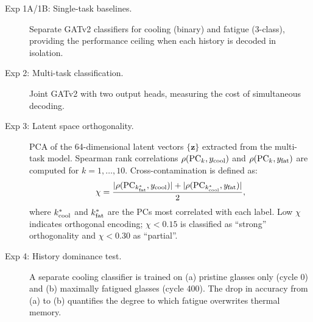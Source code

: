 \documentclass[12pt,a4paper]{article}
\newcommand{\xcontam}{\chi}
\begin{document}
\begin{description}
  \item[Exp 1A/1B: Single-task baselines.] Separate GATv2 classifiers for cooling (binary) and fatigue (3-class), providing the performance ceiling when each history is decoded in isolation.
  \item[Exp 2: Multi-task classification.] Joint GATv2 with two output heads, measuring the cost of simultaneous decoding.
  \item[Exp 3: Latent space orthogonality.] PCA of the 64-dimensional latent vectors $\{\mathbf{z}\}$ extracted from the multi-task model. Spearman rank correlations $\rho(\mathrm{PC}_k, y_{\rm cool})$ and $\rho(\mathrm{PC}_k, y_{\rm fat})$ are computed for $k = 1, \ldots, 10$. Cross-contamination is defined as:
  \begin{equation}
  \xcontam = \frac{|\rho(\mathrm{PC}_{k^*_{\rm fat}}, y_{\rm cool})| + |\rho(\mathrm{PC}_{k^*_{\rm cool}}, y_{\rm fat})|}{2},
  \label{eq:xcontam}
  \end{equation}
  where $k^*_{\rm cool}$ and $k^*_{\rm fat}$ are the PCs most correlated with each label. Low $\xcontam$ indicates orthogonal encoding; $\xcontam < 0.15$ is classified as ``strong'' orthogonality and $\xcontam < 0.30$ as ``partial''.
  \item[Exp 4: History dominance test.] A separate cooling classifier is trained on (a) pristine glasses only (cycle 0) and (b) maximally fatigued glasses (cycle 400). The drop in accuracy from (a) to (b) quantifies the degree to which fatigue overwrites thermal memory.
  

\end{description}
\end{document}
